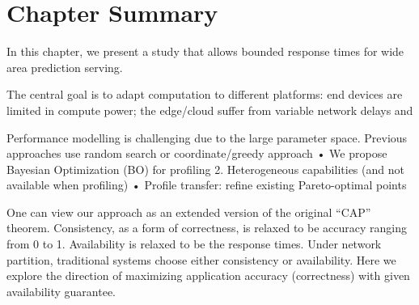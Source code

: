 \section{Chapter Summary}
\label{sec:chap-summary}

In this chapter, we present a study that allows bounded response times for wide
area prediction serving.

The central goal is to adapt computation to different platforms: end devices are
limited in compute power; the edge/cloud suffer from variable network delays and

Performance modelling is challenging due to the large parameter space. Previous
approaches use random search or coordinate/greedy approach • We propose Bayesian
Optimization (BO) for profiling 2. Heterogeneous capabilities (and not available
when profiling) • Profile transfer: refine existing Pareto-optimal points

One can view our approach as an extended version of the original ``CAP''
theorem. Consistency, as a form of correctness, is relaxed to be accuracy
ranging from 0 to 1. Availability is relaxed to be the response times. Under
network partition, traditional systems choose either consistency or
availability. Here we explore the direction of maximizing application accuracy
(correctness) with given availability guarantee.

